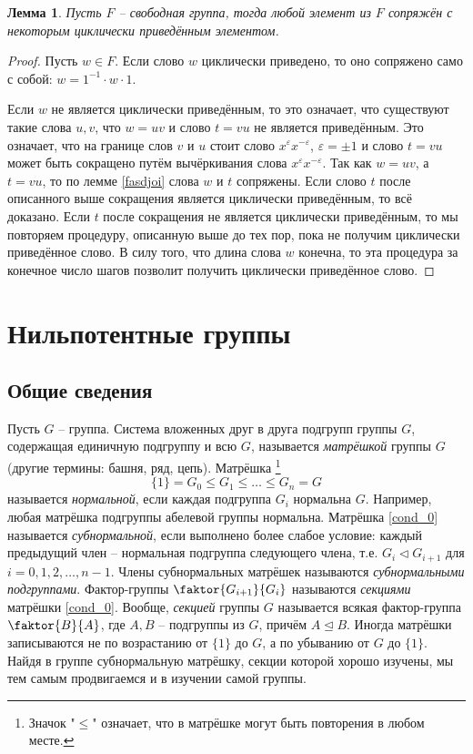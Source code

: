 \documentclass{article}
\newtheorem{lemma}{Лемма}[section]
\begin{document}
\begin{lemma}
    Пусть $F$ -- свободная группа, тогда любой элемент из $F$ сопряжён с некоторым циклически приведённым элементом.
\end{lemma}
\begin{proof}
    Пусть $w \in F$. Если слово $w$ циклически приведено, то оно сопряжено само с собой: $w = 1^{-1} \cdot w \cdot 1$.

    Если $w$ не является циклически приведённым, то это означает, что существуют такие слова $u, v$, что $w = uv$ и слово $t = vu$ не является приведённым. Это означает, что на границе слов $v$ и $u$ стоит слово $x^{\varepsilon}x^{-\varepsilon}$, $\varepsilon = \pm 1$ и слово $t = vu$ может быть сокращено путём вычёркивания слова $x^{\varepsilon}x^{-\varepsilon}$.
    Так как $w = uv$, а $t = vu$, то по лемме \ref{fasdjoi} слова $w$ и $t$ сопряжены. Если слово $t$ после описанного выше сокращения является циклически приведённым, то всё доказано. Если $t$ после сокращения не является циклически приведённым, то мы повторяем процедуру, описанную выше до тех пор, пока не получим циклически приведённое слово. В силу того, что длина слова $w$ конечна, то эта процедура за конечное число шагов позволит получить циклически приведённое слово.
\end{proof}

\newpage

\section{Нильпотентные группы}

\subsection{Общие сведения}

Пусть $G$ -- группа. Система вложенных друг в друга подгрупп группы $G$, содержащая единичную подгруппу и всю $G$, называется \textit{матрёшкой} группы $G$ (другие термины: башня, ряд, цепь). Матрёшка \footnote{Значок "$\leqslant$" означает, что в матрёшке могут быть повторения в любом месте.}
\begin{equation} \label{cond_0}
    \{ 1 \} = G_0 \leqslant G_1 \leqslant \ldots \leqslant G_n = G
\end{equation}
называется \textit{нормальной}, если каждая подгруппа $G_i$ нормальна $G$. Например, любая матрёшка подгруппы абелевой группы нормальна. Матрёшка \eqref{cond_0} называется \textit{субнормальной}, если выполнено более слабое условие: каждый предыдущий член -- нормальная подгруппа следующего члена, т.е. $ G_i \triangleleft G_{i + 1} $ для $i = 0, 1, 2, \ldots, n - 1$. Члены субнормальных матрёшек называются \textit{субнормальными подгруппами}.
Фактор-группы $\faktor{G_{i + 1}}{G_i}$ называются \textit{секциями} матрёшки \eqref{cond_0}. Вообще, \textit{секцией} группы $G$ называется всякая фактор-группа $\faktor{B}{A}$, где $A, B$ -- подгруппы из $G$, причём $A \trianglelefteq B$.
Иногда матрёшки записываются не по возрастанию от $\{ 1 \}$ до $G$, а по убыванию от $G$ до $\{ 1 \}$. Найдя в группе субнормальную матрёшку, секции которой хорошо изучены, мы тем самым продвигаемся и в изучении самой группы.
\end{document}
